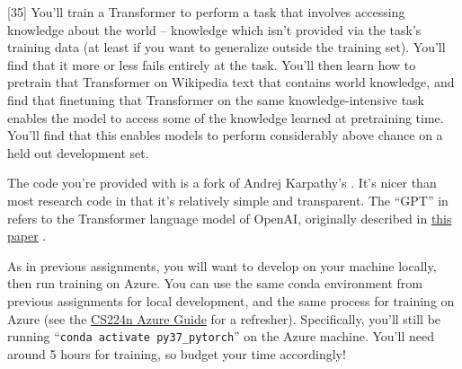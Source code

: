 \usepackage{hyperref}%
\newcommand{\Real}{\mathbb{R}}
\newcommand{\Int}{\mathbb{Z}}

\newcommand{\henc}{\bh^{\text{enc}}}
\newcommand{\hencfw}[1]{\overrightarrow{\henc_{#1}}}
\newcommand{\hencbw}[1]{\overleftarrow{\henc_{#1}}}

\newcommand{\cenc}{\bc^{\text{enc}}}
\newcommand{\cencfw}[1]{\overrightarrow{\cenc_{#1}}}
\newcommand{\cencbw}[1]{\overleftarrow{\cenc_{#1}}}

\newcommand{\hdec}{\bh^{\text{dec}}}

\newcommand{\cdec}{\bc^{\text{dec}}}

\lstset{basicstyle=\ttfamily,columns=flexible,numbers=none}

[35]
\label{sec:char_enc}
You'll train a Transformer to perform a task that involves accessing knowledge about the world -- knowledge which isn't provided via the task's training data (at least if you want to generalize outside the training set). You'll find that it more or less fails entirely at the task.
You'll then learn how to pretrain that Transformer on Wikipedia text that contains world knowledge, and find that finetuning that Transformer on the same knowledge-intensive task enables the model to access some of the knowledge learned at pretraining time.
You'll find that this enables models to perform considerably above chance on a held out development set.

The code you're provided with is a fork of Andrej Karpathy's \href{https://github.com/karpathy/minGPT}{\mingpt}.
It's nicer than most research code in that it's relatively simple and transparent.
The ``GPT'' in \mingpt refers to the Transformer language model of OpenAI, originally described in \href{https://s3-us-west-2.amazonaws.com/openai-assets/research-covers/language-unsupervised/language_understanding_paper.pdf}{this paper} \cite{radford2018improving}.

As in previous assignments, you will want to develop on your machine locally, then run training on Azure. You can use the same conda environment from previous assignments for local development, and the same process for training on Azure (see the \href{https://docs.google.com/document/d/1BQOAjhBxWbywkB4rMFH9iinb6YHSjaWw1TOVlGfyYho}{CS224n Azure Guide} for a refresher). Specifically, you'll still be running ``\texttt{conda activate py37\_pytorch}'' on the Azure machine. You'll need around 5 hours for training, so budget your time accordingly!

